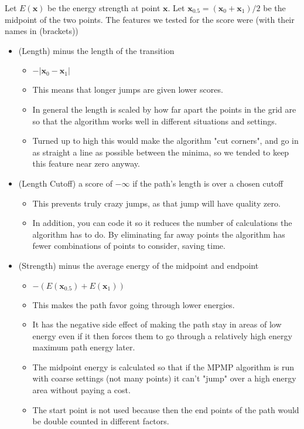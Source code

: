 Let $E(\mathbf{x})$ be the energy strength at point $\mathbf{x}$.
Let $\mathbf{x}_{0.5} = (\mathbf{x}_0 + \mathbf{x}_1) / 2$ be the midpoint of the two points.
The features we tested for the score were (with their names in (brackets))
\begin{itemize}
    \item (Length) minus the length of the transition
    \begin{itemize}
        \item $-|\mathbf{x}_0 - \mathbf{x}_1|$
        \item This means that longer jumps are given lower scores.
        \item In general the length is scaled by how far apart the points in the grid are so that the algorithm works well in different situations and settings.
        \item Turned up to high this would make the algorithm "cut corners", and go in as straight a line as possible between the minima, so we tended to keep this feature near zero anyway.
    \end{itemize}
    \item (Length Cutoff) a score of $-\infty$ if the path's length is over a chosen cutoff
    \begin{itemize}
        \item This prevents truly crazy jumps, as that jump will have quality zero.
        \item In addition, you can code it so it reduces the number of calculations the algorithm has to do.
        By eliminating far away points the algorithm has fewer combinations of points to consider, saving time.
    \end{itemize}
    \item (Strength) minus the average energy of the midpoint and endpoint
    \begin{itemize}
        \item $-(E(\mathbf{x}_{0.5})+E(\mathbf{x}_1))$
        \item This makes the path favor going through lower energies.
        \item It has the negative side effect of making the path stay in areas of low energy even if it then forces them to go through a relatively high energy maximum path energy later.
        \item The midpoint energy is calculated so that if the MPMP algorithm is run with coarse settings (not many points) it can't "jump" over a high energy area without paying a cost.
        \item The start point is not used because then the end points of the path would be double counted in different factors.

\end{itemize}
\end{itemize}
